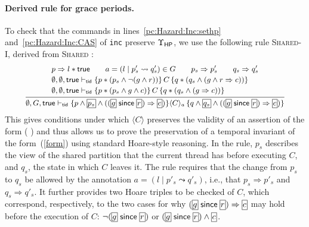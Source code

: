 \paragraph{Derived rule for grace periods.} 
To check that the commands in lines~\ref{pc:Hazard:Inc:sethp}
and~\ref{pc:Hazard:Inc:CAS} of {\tt inc} preserve 
 $\Upsilon_{\sf HP}$, we use the following rule
 \textsc{Shared-I}, derived from \textsc{Shared} \tra{\ref{app:formal}}{\nformal}:
$$
\small
\infer{
\begin{array}{@{}l@{}}
\emptyset,G,\true \vdash_\ltid 
\{p \land \shareds{p_s} \land 
((\shareds{g} \since \shareds{r}) \Rightarrow \shareds{c})\} 
\langle C \rangle_a\,    \{ q  \land \shareds{q_s} \land 
((\shareds{g} \since \shareds{r}) \Rightarrow \shareds{c}) \}
\end{array}
}{
\begin{array}{@{}l@{}}
p \Rightarrow l * \true
\qquad
a = (l \mid p'_s \leadsto q'_s) \in G 
\qquad
p_s \Rightarrow p_s'
\qquad
q_s \Rightarrow q_s'
\\[2pt]
\emptyset,\emptyset,\true \vdash_\ltid 
\{ p * (p_s \land  \neg (g \land r)) \} 
\, C \,
\{ q * (q_s \land  (g \land r \Rightarrow c)) \}
\\[2pt]
\emptyset,\emptyset,\true \vdash_\ltid 
\{ p * (p_s  \land  g \land c) \} 
\, C\,
\{ q * (q_s \land  (g \Rightarrow c)) \}
\end{array}
}
$$
This gives conditions under which $\langle C\rangle$ preserves the
validity of an assertion of the form
\be\label{form}
( \since {}) \Rightarrow {}
\ee
and thus allows us to prove the preservation of a temporal invariant
of the form~(\ref{form}) using standard Hoare-style reasoning.
In the rule, $p_s$ describes the view of the shared
partition that the current thread has before executing $C$, and $q_s$, the state
in which $C$ leaves it. The rule requires that the change from $p_s$ to $q_s$
be allowed by the annotation $a = (l \mid p'_s
\leadsto q'_s)$, i.e., that $p_s \Rightarrow p'_s$ and $q_s \Rightarrow
q'_s$. It further provides two Hoare triples to be checked of $C$, which
correspond, respectively, to the two cases for why $(\shareds{g} \since
\shareds{r}) \Rightarrow \shareds{c}$ may hold before the execution of $C$:
$\neg(\shareds{g} \since \shareds{r})$ or $(\shareds{g} \since \shareds{r})
\wedge \shareds{c}$.

